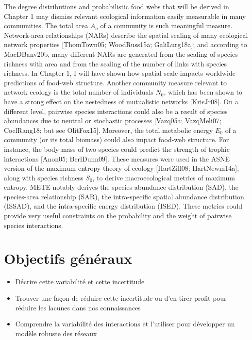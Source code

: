 The degree distributions and probabilistic food webs that will be derived in
Chapter 1 may dismiss relevant ecological information easily measurable in many
communities. The total area $A_o$ of a community is such meaningful measure.
Network-area relationships (NARs) describe the spatial scaling of many
ecological network properties [ThomTown05; WoodRuss15a; GaliLurg18a]; and
according to MacDBanv20b, many different NARs are generated from the scaling of
species richness with area and from the scaling of the number of links with
species richness. In Chapter 1, I will have shown how spatial scale impacts
worldwide predictions of food-web structure. Another community measure relevant
to network ecology is the total number of individuals $N_0$, which has been
shown to have a strong effect on the nestedness of mutualistic networks
[KrisJr08]. On a different level, pairwise species interactions could also be a
result of species abundances due to neutral or stochastic processes [Vazq05a;
VazqMeli07; CoelRang18; but see OlitFox15]. Moreover, the total metabolic
energy $E_0$ of a community (or its total biomass) could also impact food-web
structure. For instance, the body mass of two species could predict the strength
of trophic interactions [Anon05; BerlDunn09]. These measures were used in the
ASNE version of the maximum entropy theory of ecology [HartZill08;
HartNewm14a], along with species richness $S_0$, to derive macroecological
metrics of maximum entropy. METE notably derives the species-abundance
distribution (SAD), the species-area relationship (SAR), the intra-specific
spatial abundance distribution (ISSAD), and the intra-specific energy
distribution (ISED). These metrics could provide very useful constraints on the
probability and the weight of pairwise species interactions.


\section{Objectifs généraux} 

\begin{itemize}
    \item Décrire cette variabilité et cette incertitude
    \item Trouver une façon de réduire cette incertitude ou d'en tirer profit pour réduire les lacunes dans nos connaissances
    \item Comprendre la variabilité des interactions et l'utiliser pour développer un modèle robuste des réseaux
\end{itemize}

